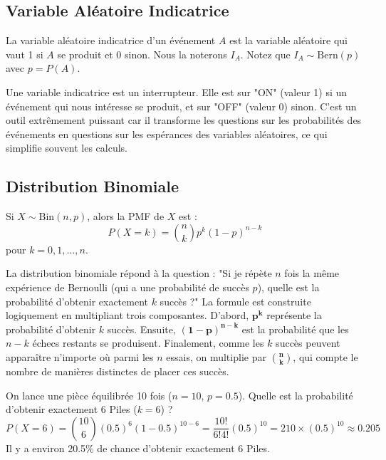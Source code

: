 \subsection{Variable Aléatoire Indicatrice}

\begin{definitionbox}
La variable aléatoire indicatrice d'un événement $A$ est la variable aléatoire qui vaut 1 si $A$ se produit et 0 sinon. Nous la noterons $I_A$. Notez que $I_A \sim \text{Bern}(p)$ avec $p=P(A)$.
\end{definitionbox}

\begin{intuitionbox}
Une variable indicatrice est un interrupteur. Elle est sur "ON" (valeur 1) si un événement qui nous intéresse se produit, et sur "OFF" (valeur 0) sinon. C'est un outil extrêmement puissant car il transforme les questions sur les probabilités des événements en questions sur les espérances des variables aléatoires, ce qui simplifie souvent les calculs.
\end{intuitionbox}

\subsection{Distribution Binomiale}

\begin{theorembox}
Si $X \sim \text{Bin}(n, p)$, alors la PMF de $X$ est :
$$ P(X=k) = \binom{n}{k} p^k (1-p)^{n-k} $$
pour $k = 0, 1, \dots, n$.
\end{theorembox}

\begin{intuitionbox}
La distribution binomiale répond à la question : "Si je répète $n$ fois la même expérience de Bernoulli (qui a une probabilité de succès $p$), quelle est la probabilité d'obtenir exactement $k$ succès ?"
La formule est construite logiquement en multipliant trois composantes. D'abord, $\mathbf{p^k}$ représente la probabilité d'obtenir $k$ succès. Ensuite, $\mathbf{(1-p)^{n-k}}$ est la probabilité que les $n-k$ échecs restants se produisent. Finalement, comme les $k$ succès peuvent apparaître n'importe où parmi les $n$ essais, on multiplie par $\mathbf{\binom{n}{k}}$, qui compte le nombre de manières distinctes de placer ces succès.
\end{intuitionbox}

\begin{examplebox}
On lance une pièce équilibrée 10 fois ($n=10$, $p=0.5$). Quelle est la probabilité d'obtenir exactement 6 Piles ($k=6$) ?
$$ P(X=6) = \binom{10}{6} (0.5)^6 (1-0.5)^{10-6} = \frac{10!}{6!4!} (0.5)^{10} = 210 \times (0.5)^{10} \approx 0.205 $$
Il y a environ 20.5\% de chance d'obtenir exactement 6 Piles.
\end{examplebox}

